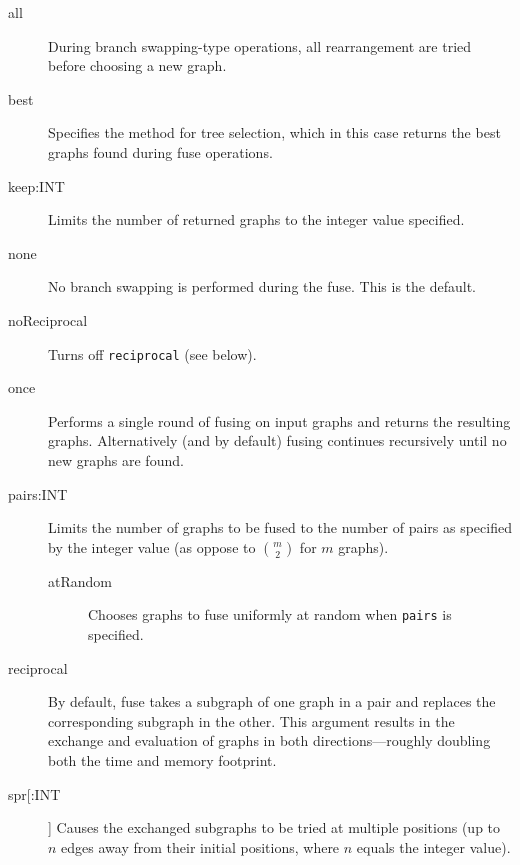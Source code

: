 	\begin{description}
		\item [all]  During branch swapping-type operations, all rearrangement are tried before 
		choosing a new graph. 
		
		
		\item [best] Specifies the method for tree selection, which in this case returns the best graphs 
		found during fuse operations.		
		
		\item [keep:INT] Limits the number of returned graphs to the integer value specified. 
		
		\item [none] No branch swapping is performed during the fuse. This is the default.
		
		\item [noReciprocal] Turns off \texttt{reciprocal} (see below).
		
		\item [once] Performs a single round of fusing on input graphs and returns the resulting graphs. 
		Alternatively (and by default) fusing continues recursively until no new graphs are found.
		
		\item [pairs:INT] Limits the number of graphs to be fused to the number of pairs as 
		specified by the integer value (as oppose to $\binom{m}{2}$ for $m$ graphs).
		
			\begin{description}
			\item [atRandom] Chooses graphs to fuse uniformly at random when \texttt{pairs} is 
			specified. 
			\end{description}
		
		\item [reciprocal] By default, fuse takes a subgraph of one graph in a pair and replaces the 
		corresponding subgraph in the other.  This argument results in the exchange and evaluation 
		of graphs in both directions---roughly doubling both the time and memory footprint.
		
		\item [spr[:INT]] Causes the exchanged subgraphs to be tried at multiple positions (up to 
		$n$ edges away from their initial positions, where $n$ equals the integer value).
		

\end{description}

